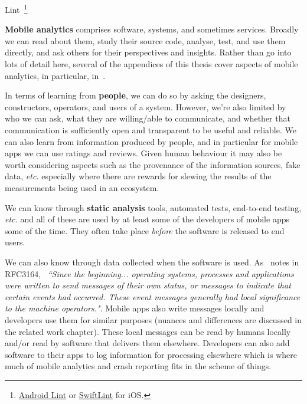 Lint~\footnote{\href{https://developer.android.com/studio/write/lint}{Android Lint} or \href{https://github.com/realm/SwiftLint}{SwiftLint} for iOS.}


\textbf{Mobile analytics} comprises software, systems, and sometimes services. Broadly we can read about them, study their source code, analyse, test, and use them directly, and ask others for their perspectives and insights. Rather than go into lots of detail here, several of the appendices of this thesis cover aspects of mobile analytics, in particular, in~\href{app:on-mobile-analytics}{\emph{}}.

In terms of learning from \textbf{people}, we can do so by asking the designers, constructors, operators, and users of a system. However, we're also limited by who we can ask, what they are willing/able to communicate, and whether that communication is sufficiently open and transparent to be useful and reliable. We can also learn from information produced by people, and in particular for mobile apps we can use ratings and reviews. Given human behaviour it may also be worth considering aspects such as the provenance of the information sources, fake data, \emph{etc.} especially where there are rewards for slewing the results of the measurements being used in an ecosystem.

We can know through \textbf{static analysis} tools, automated tests, end-to-end testing, \emph{etc.} and all of these are used by at least some of the developers of mobile apps some of the time. They often take place \textit{before} the software is released to end users.

We can also know through data collected when the software is used. As~\cite{RFC3164} notes in RFC3164, ~\emph{``Since the beginning... operating systems, processes and applications were written to send messages of their own status, or messages to indicate that certain events had occurred. These event messages generally had local significance to the machine operators."}. Mobile apps also write messages locally and developers use them for similar purposes (nuances and differences are discussed in the related work chapter). These local messages can be read by humans locally and/or read by software that delivers them elsewhere. Developers can also add software to their apps to log information for processing elsewhere which is where much of mobile analytics and crash reporting fits in the scheme of things.


